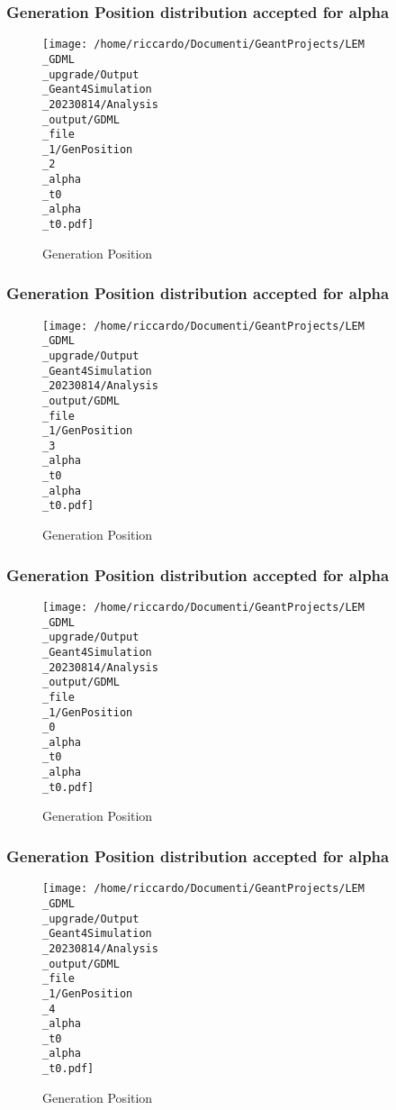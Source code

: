 \documentclass[8pt]{beamer}
\begin{document}
            \begin{frame}
                \frametitle{Generation Position distribution accepted for alpha}
            
        \begin{figure}[h]
            \centering
            \texttt{[image: /home/riccardo/Documenti/GeantProjects/LEM\\\_GDML\\\_upgrade/Output\\\_Geant4Simulation\\\_20230814/Analysis\\\_output/GDML\\\_file\\\_1/GenPosition\\\_2\\\_alpha\\\_t0\\\_alpha\\\_t0.pdf]}
            \caption{Generation Position}
        \end{figure}
        
            \end{frame}
            
            \begin{frame}
                \frametitle{Generation Position distribution accepted for alpha}
            
        \begin{figure}[h]
            \centering
            \texttt{[image: /home/riccardo/Documenti/GeantProjects/LEM\\\_GDML\\\_upgrade/Output\\\_Geant4Simulation\\\_20230814/Analysis\\\_output/GDML\\\_file\\\_1/GenPosition\\\_3\\\_alpha\\\_t0\\\_alpha\\\_t0.pdf]}
            \caption{Generation Position}
        \end{figure}
        
            \end{frame}
            
            \begin{frame}
                \frametitle{Generation Position distribution accepted for alpha}
            
        \begin{figure}[h]
            \centering
            \texttt{[image: /home/riccardo/Documenti/GeantProjects/LEM\\\_GDML\\\_upgrade/Output\\\_Geant4Simulation\\\_20230814/Analysis\\\_output/GDML\\\_file\\\_1/GenPosition\\\_0\\\_alpha\\\_t0\\\_alpha\\\_t0.pdf]}
            \caption{Generation Position}
        \end{figure}
        
            \end{frame}
            
            \begin{frame}
                \frametitle{Generation Position distribution accepted for alpha}
            
        \begin{figure}[h]
            \centering
            \texttt{[image: /home/riccardo/Documenti/GeantProjects/LEM\\\_GDML\\\_upgrade/Output\\\_Geant4Simulation\\\_20230814/Analysis\\\_output/GDML\\\_file\\\_1/GenPosition\\\_4\\\_alpha\\\_t0\\\_alpha\\\_t0.pdf]}
            \caption{Generation Position}
        \end{figure}
        
            \end{frame}
            
\end{document}
